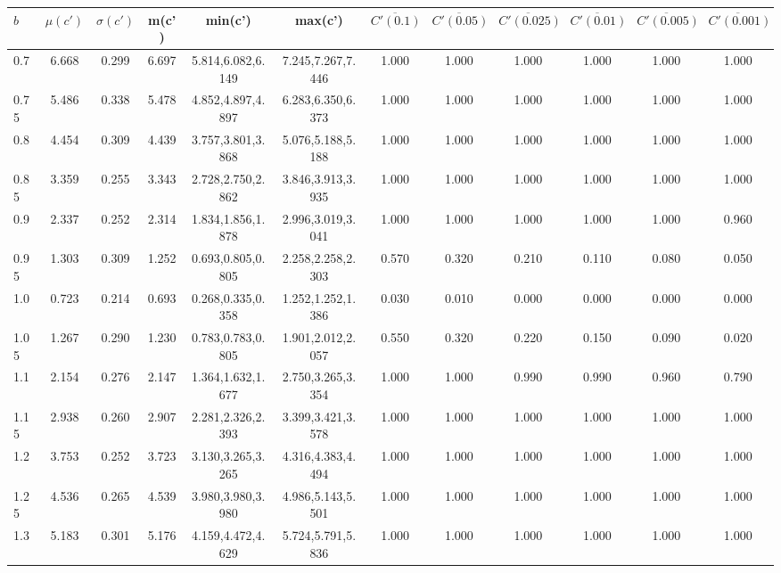 \begin{table*}[h!]
\begin{center}
\begin{tabular}{| l | c | c | c | c | c | c | c | c | c | c | c |}\hline
$b$ & $\mu(c')$ & $\sigma(c')$ & m(c') & min(c') & max(c') & $\overline{C'(0.1)}$ & $\overline{C'(0.05)}$ & $\overline{C'(0.025)}$ & $\overline{C'(0.01)}$ & $\overline{C'(0.005)}$ & $\overline{C'(0.001)}$ \\\hline
0.7 & 6.668 & 0.299 & 6.697 & 5.814,6.082,6.149 & 7.245,7.267,7.446  & 1.000  & 1.000  & 1.000  & 1.000  & 1.000  & 1.000 \\\hline
0.75 & 5.486 & 0.338 & 5.478 & 4.852,4.897,4.897 & 6.283,6.350,6.373  & 1.000  & 1.000  & 1.000  & 1.000  & 1.000  & 1.000 \\\hline
0.8 & 4.454 & 0.309 & 4.439 & 3.757,3.801,3.868 & 5.076,5.188,5.188  & 1.000  & 1.000  & 1.000  & 1.000  & 1.000  & 1.000 \\\hline
0.85 & 3.359 & 0.255 & 3.343 & 2.728,2.750,2.862 & 3.846,3.913,3.935  & 1.000  & 1.000  & 1.000  & 1.000  & 1.000  & 1.000 \\\hline
0.9 & 2.337 & 0.252 & 2.314 & 1.834,1.856,1.878 & 2.996,3.019,3.041  & 1.000  & 1.000  & 1.000  & 1.000  & 1.000  & 0.960 \\\hline
0.95 & 1.303 & 0.309 & 1.252 & 0.693,0.805,0.805 & 2.258,2.258,2.303  & 0.570  & 0.320  & 0.210  & 0.110  & 0.080  & 0.050 \\\hline
1.0 & 0.723 & 0.214 & 0.693 & 0.268,0.335,0.358 & 1.252,1.252,1.386  & 0.030  & 0.010  & 0.000  & 0.000  & 0.000  & 0.000 \\\hline
1.05 & 1.267 & 0.290 & 1.230 & 0.783,0.783,0.805 & 1.901,2.012,2.057  & 0.550  & 0.320  & 0.220  & 0.150  & 0.090  & 0.020 \\\hline
1.1 & 2.154 & 0.276 & 2.147 & 1.364,1.632,1.677 & 2.750,3.265,3.354  & 1.000  & 1.000  & 0.990  & 0.990  & 0.960  & 0.790 \\\hline
1.15 & 2.938 & 0.260 & 2.907 & 2.281,2.326,2.393 & 3.399,3.421,3.578  & 1.000  & 1.000  & 1.000  & 1.000  & 1.000  & 1.000 \\\hline
1.2 & 3.753 & 0.252 & 3.723 & 3.130,3.265,3.265 & 4.316,4.383,4.494  & 1.000  & 1.000  & 1.000  & 1.000  & 1.000  & 1.000 \\\hline
1.25 & 4.536 & 0.265 & 4.539 & 3.980,3.980,3.980 & 4.986,5.143,5.501  & 1.000  & 1.000  & 1.000  & 1.000  & 1.000  & 1.000 \\\hline
1.3 & 5.183 & 0.301 & 5.176 & 4.159,4.472,4.629 & 5.724,5.791,5.836  & 1.000  & 1.000  & 1.000  & 1.000  & 1.000  & 1.000 \\\hline

\end{tabular}
\end{center}
\end{table*}
